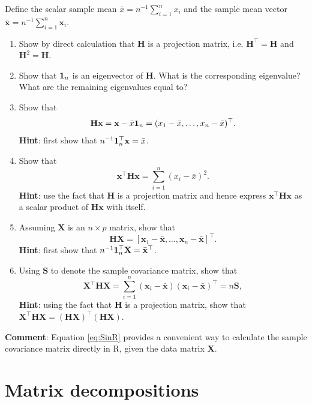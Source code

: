 \documentclass[]{book}
\theoremstyle{definition}
\theoremstyle{definition}
\theoremstyle{definition}
\theoremstyle{remark}
\begin{document}
\begin{enumerate}
  Define the scalar sample mean \(\bar{x}=n^{-1}\sum_{i=1}^n x_i\) and the sample mean vector \(\bar{\mathbf x}=n^{-1} \sum_{i=1}^n \mathbf x_i\).

  \begin{enumerate}
  \def\labelenumii{\roman{enumii}.}
  \item
    Show by direct calculation that \(\mathbf H\) is a projection matrix, i.e. \(\mathbf H^\top = \mathbf H\) and \(\mathbf H^2 =\mathbf H\).
  \item
    Show that \({\bf 1}_n\) is an eigenvector of \(\mathbf H\). What is the corresponding eigenvalue? What are the remaining eigenvalues equal to?
  \item
    Show that
    \[
      \mathbf H\mathbf x= \mathbf x- \bar{x}{\bf 1}_n = (  x_1 - \bar{x}, \ldots , x_n -\bar{x})^\top.
      \]
    \textbf{Hint}: first show that \(n^{-1}{\bf 1}_n^\top \mathbf x=\bar{x}\).
  \item
    Show that
    \[
      \mathbf x^\top \mathbf H\mathbf x= \sum_{i=1}^n (x_i-\bar{x})^2.
      \]
    \textbf{Hint}: use the fact that \(\mathbf H\) is a projection matrix and hence express \(\mathbf x^\top \mathbf H\mathbf x\) as a scalar product of \(\mathbf H\mathbf x\) with itself.
  \item
    Assuming \(\mathbf X\) is an \(n \times p\) matrix, show that
    \[
      \mathbf H\mathbf X=[\mathbf x_1 - \bar{\mathbf x}, \ldots , \mathbf x_n -\bar{\mathbf x}]^\top.
      \]
    \textbf{Hint}: first show that \(n^{-1} {\bf 1}_n^\top \mathbf X=\bar{\mathbf x}^\top\).
  \item
    Using \(\mathbf S\) to denote the sample covariance matrix, show that
    \begin{equation}
      \mathbf X^\top \mathbf H\mathbf X= \sum_{i=1}^n (\mathbf x_i -\bar{\mathbf x})(\mathbf x_i -\bar{\mathbf x})^\top = n\mathbf S,
       \label{eq:SinR}
      \end{equation}
    \textbf{Hint}: using the fact that \(\mathbf H\) is a projection matrix,
    show that
    \(\mathbf X^\top \mathbf H\mathbf X=(\mathbf H\mathbf X)^\top (\mathbf H\mathbf X)\).
  \end{enumerate}

  \textbf{Comment}: Equation \eqref{eq:SinR} provides a convenient way to calculate the sample covariance matrix directly in R, given the data matrix \(\mathbf X\).
\end{enumerate}

\hypertarget{linalg-decomp}{%
\chapter{Matrix decompositions}\label{linalg-decomp}}
\end{document}
